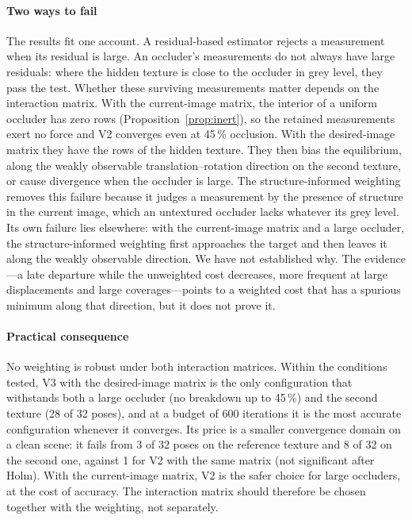 \documentclass[preprint,12pt]{elsarticle}
\theoremstyle{remark}
\begin{document}
\paragraph{Two ways to fail}
The results fit one account. A residual-based estimator rejects a measurement
when its residual is large. An occluder's measurements do not always have large
residuals: where the hidden texture is close to the occluder in grey level,
they pass the test. Whether these surviving measurements matter depends on the
interaction matrix. With the current-image matrix, the interior of a uniform
occluder has zero rows (Proposition~\ref{prop:inert}), so the retained
measurements exert no force and V2 converges even at 45\,\% occlusion. With
the desired-image matrix they have the rows of the hidden texture. They then
bias the equilibrium, along the weakly observable translation--rotation
direction on the second texture, or cause divergence when the occluder is
large. The structure-informed weighting removes this failure because it judges
a measurement by the presence of structure in the current image, which an
untextured occluder lacks whatever its grey level. Its own failure lies
elsewhere: with the current-image matrix and a large occluder, the
structure-informed weighting first approaches the target and then leaves it
along the weakly observable direction. We have not established why. The
evidence---a late departure while the unweighted cost decreases, more frequent
at large displacements and large coverages---points to a weighted cost that
has a spurious minimum along that direction, but it does not prove it.

\paragraph{Practical consequence}
No weighting is robust under both interaction matrices. Within the conditions
tested, V3 with the desired-image matrix is the only configuration that
withstands both a large occluder (no breakdown up to 45\,\%) and the second
texture (28 of 32 poses), and at a budget of 600 iterations it is the most
accurate configuration whenever it converges. Its price is a smaller convergence domain on a clean scene: it
fails from 3 of 32 poses on the reference texture and 8 of 32 on the second
one, against 1 for V2 with the same matrix (not significant after Holm). With
the current-image matrix, V2 is the safer choice for large occluders, at the
cost of accuracy. The interaction matrix should therefore be chosen together
with the weighting, not separately.
\end{document}
